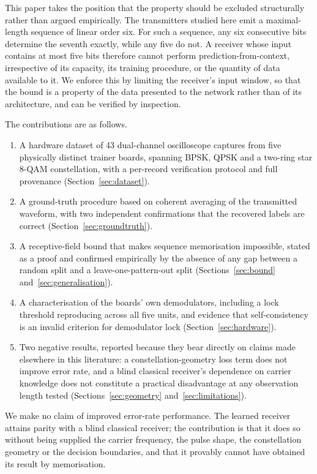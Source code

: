 \documentclass[journal]{IEEEtran}   %
\begin{document}
This paper takes the position that the property should be excluded structurally
rather than argued empirically. The transmitters studied here emit a
maximal-length sequence of linear order six. For such a sequence, any six
consecutive bits determine the seventh exactly, while any five do not. A
receiver whose input contains at most five bits therefore cannot perform
prediction-from-context, irrespective of its capacity, its training procedure,
or the quantity of data available to it. We enforce this by limiting the
receiver's input window, so that the bound is a property of the data presented
to the network rather than of its architecture, and can be verified by
inspection.

The contributions are as follows.

\begin{enumerate}
\item A hardware dataset of 43 dual-channel oscilloscope captures from five
physically distinct trainer boards, spanning BPSK, QPSK and a two-ring star
8-QAM constellation, with a per-record verification protocol and full
provenance (Section~\ref{sec:dataset}).
\item A ground-truth procedure based on coherent averaging of the transmitted
waveform, with two independent confirmations that the recovered labels are
correct (Section~\ref{sec:groundtruth}).
\item A receptive-field bound that makes sequence memorisation impossible,
stated as a proof and confirmed empirically by the absence of any gap between a
random split and a leave-one-pattern-out split (Sections~\ref{sec:bound}
and~\ref{sec:generalisation}).
\item A characterisation of the boards' own demodulators, including a lock
threshold reproducing across all five units, and evidence that self-consistency
is an invalid criterion for demodulator lock (Section~\ref{sec:hardware}).
\item Two negative results, reported because they bear directly on claims made
elsewhere in this literature: a constellation-geometry loss term does not
improve error rate, and a blind classical receiver's dependence on carrier
knowledge does not constitute a practical disadvantage at any observation length
tested (Sections~\ref{sec:geometry} and~\ref{sec:limitations}).
\end{enumerate}

We make no claim of improved error-rate performance. The learned receiver
attains parity with a blind classical receiver; the contribution is that it does
so without being supplied the carrier frequency, the pulse shape, the
constellation geometry or the decision boundaries, and that it provably cannot
have obtained its result by memorisation.
\end{document}

